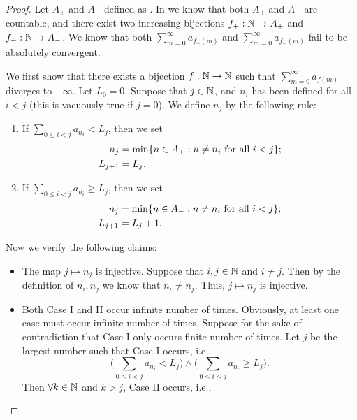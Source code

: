 \begin{proof}
  Let \(A_+\) and \(A_-\) defined as .
  In  we know that both \(A_+\) and \(A_-\) are countable, and there exist two increasing bijections \(f_+ : \mathbb{N} \to A_+\) and \(f_- : \mathbb{N} \to A_-\).
  We know that both \(\sum_{m = 0}^\infty a_{f_+(m)}\) and \(\sum_{m = 0}^\infty a_{f_-(m)}\) fail to be absolutely convergent.

  We first show that there exists a bijection \(f : \mathbb{N} \to \mathbb{N}\) such that \(\sum_{m = 0}^\infty a_{f(m)}\) diverges to \(+\infty\).
  Let \(L_0 = 0\).
  Suppose that \(j \in \mathbb{N}\), and \(n_i\) has been defined for all \(i < j\)
  (this is vacuously true if \(j = 0\)).
  We define \(n_j\) by the following rule:
  \begin{enumerate}[label=(\Roman*)]
    \item If \(\sum_{0 \leq i < j} a_{n_i} < L_j\), then we set
          \begin{align*}
            n_j       & = \min\set{n \in A_+ : n \neq n_i \text{ for all } i < j}; \\
            L_{j + 1} & = L_j.
          \end{align*}
    \item If \(\sum_{0 \leq i < j} a_{n_i} \geq L_j\), then we set
          \begin{align*}
            n_j       & = \min\set{n \in A_- : n \neq n_i \text{ for all } i < j}; \\
            L_{j + 1} & = L_j + 1.
          \end{align*}
  \end{enumerate}
  Now we verify the following claims:
  \begin{itemize}
    \item The map \(j \mapsto n_j\) is injective.
          Suppose that \(i, j \in \mathbb{N}\) and \(i \neq j\).
          Then by the definition of \(n_i, n_j\) we know that \(n_i \neq n_j\).
          Thus, \(j \mapsto n_j\) is injective.
    \item Both Case I and II occur infinite number of times.
          Obviously, at least one case must occur infinite number of times.
          Suppose for the sake of contradiction that Case I only occurs finite number of times.
          Let \(j\) be the largest number such that Case I occurs, i.e.,
          \[
            \Bigg(\sum_{0 \leq i < j} a_{n_i} < L_j\Bigg) \land \Bigg(\sum_{0 \leq i \leq j} a_{n_i} \geq L_j\Bigg).
          \]
          Then \(\forall k \in \mathbb{N}\) and \(k > j\), Case II occurs, i.e.,

\end{itemize}
\end{proof}
